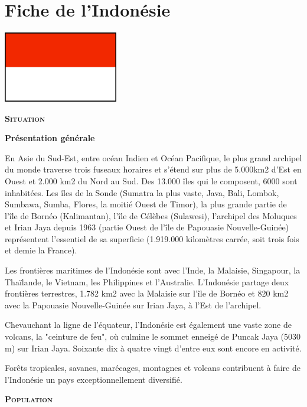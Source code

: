 \section{Fiche de l'Indonésie}


\smallbreak
\hspace*{-0.65cm}
\includegraphics[width=5cm]{articles/Fiche-de-l-indonesie/drapeauindonesie.png}
\smallbreak

\textbf{\textsc{Situation}}

\textbf{Présentation générale}

En Asie du Sud-Est, entre océan Indien et Océan Pacifique, le plus grand archipel du monde traverse trois fuseaux horaires et s'étend sur plus de 5.000km2 d'Est en Ouest et 2.000 km2 du Nord au Sud. Des 13.000 îles qui le composent, 6000 sont inhabitées. Les îles de la Sonde (Sumatra la plus vaste, Java, Bali, Lombok, Sumbawa, Sumba, Flores, la moitié Ouest de Timor), la plus grande partie de l'île de Bornéo (Kalimantan), l'île de Célèbes (Sulawesi), l'archipel des Moluques et Irian Jaya depuis 1963 (partie Ouest de l'île de Papouasie Nouvelle-Guinée) représentent l'essentiel de sa superficie (1.919.000 kilomètres carrée, soit trois fois et demie la France).

Les frontières maritimes de l'Indonésie sont avec l'Inde, la Malaisie, Singapour, la Thaïlande, le Vietnam, les Philippines et l'Australie. L'Indonésie partage deux frontières terrestres, 1.782 km2 avec la Malaisie sur l'île de Bornéo et 820 km2 avec la Papouasie Nouvelle-Guinée sur Irian Jaya, à l'Est de l'archipel.

Chevauchant la ligne de l'équateur, l'Indonésie est également une vaste zone de volcans, la "ceinture de feu", où culmine le sommet enneigé de Puncak Jaya (5030 m) sur Irian Jaya. Soixante dix à quatre vingt d'entre eux sont encore en activité.

Forêts tropicales, savanes, marécages, montagnes et volcans contribuent à faire de l'Indonésie un pays exceptionnellement diversifié.

\textbf{\textsc{Population}}


